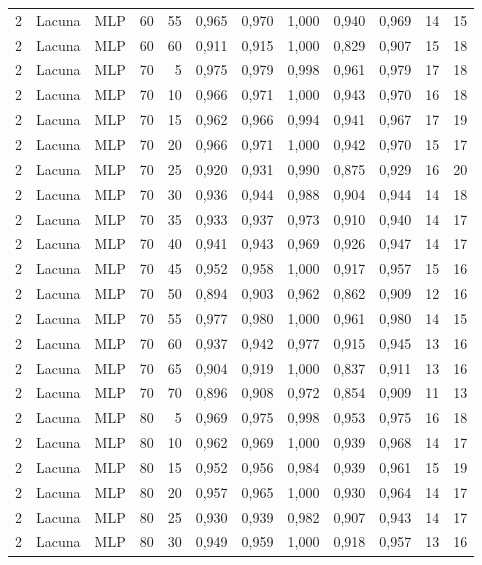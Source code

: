 \begin{longtable}{ccclrrrrrrrr}
2 & Lacuna & MLP & 60 & 55 & 0,965 & 0,970 & 1,000 & 0,940 & 0,969 & 14 & 15 \\
2 & Lacuna & MLP & 60 & 60 & 0,911 & 0,915 & 1,000 & 0,829 & 0,907 & 15 & 18 \\
2 & Lacuna & MLP & 70 & 5 & 0,975 & 0,979 & 0,998 & 0,961 & 0,979 & 17 & 18 \\
2 & Lacuna & MLP & 70 & 10 & 0,966 & 0,971 & 1,000 & 0,943 & 0,970 & 16 & 18 \\
2 & Lacuna & MLP & 70 & 15 & 0,962 & 0,966 & 0,994 & 0,941 & 0,967 & 17 & 19 \\
2 & Lacuna & MLP & 70 & 20 & 0,966 & 0,971 & 1,000 & 0,942 & 0,970 & 15 & 17 \\
2 & Lacuna & MLP & 70 & 25 & 0,920 & 0,931 & 0,990 & 0,875 & 0,929 & 16 & 20 \\
2 & Lacuna & MLP & 70 & 30 & 0,936 & 0,944 & 0,988 & 0,904 & 0,944 & 14 & 18 \\
2 & Lacuna & MLP & 70 & 35 & 0,933 & 0,937 & 0,973 & 0,910 & 0,940 & 14 & 17 \\
2 & Lacuna & MLP & 70 & 40 & 0,941 & 0,943 & 0,969 & 0,926 & 0,947 & 14 & 17 \\
2 & Lacuna & MLP & 70 & 45 & 0,952 & 0,958 & 1,000 & 0,917 & 0,957 & 15 & 16 \\
2 & Lacuna & MLP & 70 & 50 & 0,894 & 0,903 & 0,962 & 0,862 & 0,909 & 12 & 16 \\
2 & Lacuna & MLP & 70 & 55 & 0,977 & 0,980 & 1,000 & 0,961 & 0,980 & 14 & 15 \\
2 & Lacuna & MLP & 70 & 60 & 0,937 & 0,942 & 0,977 & 0,915 & 0,945 & 13 & 16 \\
2 & Lacuna & MLP & 70 & 65 & 0,904 & 0,919 & 1,000 & 0,837 & 0,911 & 13 & 16 \\
2 & Lacuna & MLP & 70 & 70 & 0,896 & 0,908 & 0,972 & 0,854 & 0,909 & 11 & 13 \\
2 & Lacuna & MLP & 80 & 5 & 0,969 & 0,975 & 0,998 & 0,953 & 0,975 & 16 & 18 \\
2 & Lacuna & MLP & 80 & 10 & 0,962 & 0,969 & 1,000 & 0,939 & 0,968 & 14 & 17 \\
2 & Lacuna & MLP & 80 & 15 & 0,952 & 0,956 & 0,984 & 0,939 & 0,961 & 15 & 19 \\
2 & Lacuna & MLP & 80 & 20 & 0,957 & 0,965 & 1,000 & 0,930 & 0,964 & 14 & 17 \\
2 & Lacuna & MLP & 80 & 25 & 0,930 & 0,939 & 0,982 & 0,907 & 0,943 & 14 & 17 \\
2 & Lacuna & MLP & 80 & 30 & 0,949 & 0,959 & 1,000 & 0,918 & 0,957 & 13 & 16 \\

\end{longtable}
